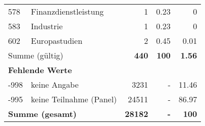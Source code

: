 \begin{longtable}{lXrrr}
        578 & \multicolumn{1}{X}{Finanzdienstleistung} & %
          \num{1} &
          \num[round-mode=places,round-precision=2]{0.23} &
          \num[round-mode=places,round-precision=2]{0} \\

        583 & \multicolumn{1}{X}{Industrie} & %
          \num{1} &
          \num[round-mode=places,round-precision=2]{0.23} &
          \num[round-mode=places,round-precision=2]{0} \\

        602 & \multicolumn{1}{X}{Europastudien} & %
          \num{2} &
          \num[round-mode=places,round-precision=2]{0.45} &
          \num[round-mode=places,round-precision=2]{0.01} \\

     \midrule
     \multicolumn{2}{l}{Summe (gültig)} &
       \textbf{\num{440}} &
     \textbf{100} &
       \textbf{\num[round-mode=places,round-precision=2]{1.56}} \\
     \multicolumn{5}{l}{\textbf{Fehlende Werte}}\\
       -998 &
       keine Angabe &
         \num{3231} &
        - &
         \num[round-mode=places,round-precision=2]{11.46} \\
       -995 &
       keine Teilnahme (Panel) &
         \num{24511} &
        - &
         \num[round-mode=places,round-precision=2]{86.97} \\
     \midrule
     \multicolumn{2}{l}{\textbf{Summe (gesamt)}} &
          \textbf{\num{28182}} &
        \textbf{-} &
        \textbf{100} \\
     \bottomrule
     \end{longtable}
     
